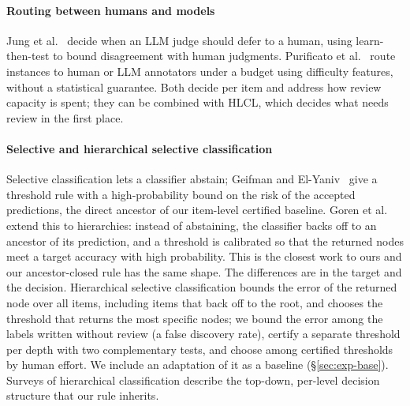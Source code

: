\documentclass[preprint,12pt]{elsarticle}
\theoremstyle{definition}
\theoremstyle{remark}
\newcommand{\hlcl}{\textup{\textsc{HLCL}}}
\begin{document}
\paragraph{Routing between humans and models}
Jung et al.~\cite{jung2025trust} decide when an LLM judge should defer to a
human, using learn-then-test to bound disagreement with human judgments.
Purificato et al.~\cite{quorum2026} route instances to human or LLM annotators
under a budget using difficulty features, without a statistical guarantee. Both
decide per item and address how review capacity is spent; they can be combined
with \hlcl{}, which decides what needs review in the first place.

\paragraph{Selective and hierarchical selective classification}
Selective classification lets a classifier abstain; Geifman and
El-Yaniv~\cite{geifman2017selective} give a threshold rule with a
high-probability bound on the risk of the accepted predictions, the direct
ancestor of our item-level certified baseline. Goren et al.~\cite{goren2024hierarchical}
extend this to hierarchies: instead of abstaining, the classifier backs off to an
ancestor of its prediction, and a threshold is calibrated so that the returned
nodes meet a target accuracy with high probability. This is the closest work to
ours and our ancestor-closed rule has the same shape. The differences are in the
target and the decision. Hierarchical selective classification bounds the error
of the returned node over all items, including items that back off to the root,
and chooses the threshold that returns the most specific nodes; we bound the
error among the labels written without review (a false discovery rate), certify
a separate threshold per depth with two complementary tests, and choose among
certified thresholds by human effort. We include an adaptation of it as a
baseline (\S\ref{sec:exp-base}). Surveys of hierarchical classification
\cite{silla2011survey} describe the top-down, per-level decision structure that
our rule inherits.
\end{document}
